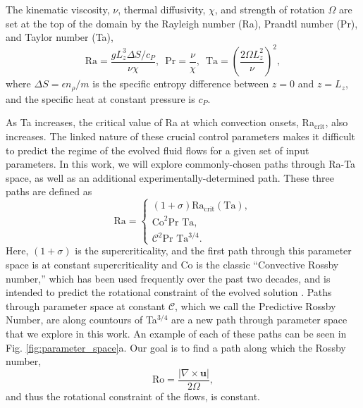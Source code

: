 \documentclass[twocolumn, amsmath, amsfonts, amssymb]{aastex62}
\newcommand{\grad}{\ensuremath{\nabla}}
\begin{document}
The kinematic viscosity, $\nu$, thermal diffusivity, $\chi$, and strength of
rotation $\Omega$ are set at the top of the domain by the Rayleigh number
(Ra), Prandtl number (Pr), and Taylor number (Ta),
\begin{equation}
\text{Ra} = \frac{g L_z^3 \Delta S / c_P}{\nu \chi}, \,\,\,
\text{Pr} = \frac{\nu}{\chi}, \,\,\,
\text{Ta} = \left(\frac{2 \Omega L_z^2}{\nu}\right)^2,
\end{equation}
where $\Delta S = \epsilon n_\rho / m$ is the specific entropy difference between
$z = 0$ and $z = L_z$, and the specific heat at constant pressure is $c_P$.

As Ta increases, the critical value of Ra at which convection onsets,
Ra$_{\text{crit}}$, also increases. The linked nature of these crucial
control parameters makes it difficult to predict the regime of the evolved
fluid flows for a given set of input parameters. In this work, we will
explore commonly-chosen paths through Ra-Ta space, as well as an additional
experimentally-determined path. These three paths are defined as
\begin{equation}
\text{Ra} = 
\begin{cases}
(1 + \sigma)\text{Ra}_\text{crit}(\text{Ta}), \\
\text{Co}^2\text{Pr Ta}, \\
\mathcal{C}^2 \text{Pr Ta}^{3/4}.
\end{cases}
\label{eqn:paths}
\end{equation}
Here, $(1 + \sigma)$ is the supercriticality, and the first path through
this parameter space is at constant supercriticality and Co is the classic
``Convective Rossby number,'' which has been used frequently over the past
two decades, and is intended to predict the rotational constraint of the
evolved solution \citep{julien&all1996, brummell&all1996}. Paths through parameter
space at constant $\mathcal{C}$, which we call the Predictive Rossby Number,
are along countours of Ta$^{3/4}$ are a new path
through parameter space that we explore in this work. An example of each of these paths
can be seen in Fig. \ref{fig:parameter_space}a.  Our goal is to find a path
along which the Rossby number,
\begin{equation}
\text{Ro} = \frac{|\grad\times \bm{u}|}{2 \Omega},
\label{eqn:ro}
\end{equation}
and thus the rotational constraint of the flows, is constant.
\end{document}
